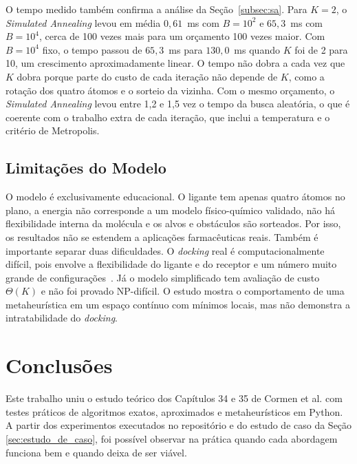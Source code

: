 \documentclass[conference]{IEEEtran}
\theoremstyle{definition}
\theoremstyle{plain}
\begin{document}
O tempo medido também confirma a análise da Seção~\ref{subsec:sa}. Para $K = 2$, o \textit{Simulated Annealing} levou em média $0{,}61$~ms com $B = 10^2$ e $65{,}3$~ms com $B = 10^4$, cerca de 100 vezes mais para um orçamento 100 vezes maior. Com $B = 10^4$ fixo, o tempo passou de $65{,}3$~ms para $130{,}0$~ms quando $K$ foi de 2 para 10, um crescimento aproximadamente linear. O tempo não dobra a cada vez que $K$ dobra porque parte do custo de cada iteração não depende de $K$, como a rotação dos quatro átomos e o sorteio da vizinha. Com o mesmo orçamento, o \textit{Simulated Annealing} levou entre 1,2 e 1,5 vez o tempo da busca aleatória, o que é coerente com o trabalho extra de cada iteração, que inclui a temperatura e o critério de Metropolis.

\subsection{Limitações do Modelo}
\label{subsec:limitacoes}

O modelo é exclusivamente educacional. O ligante tem apenas quatro átomos no plano, a energia não corresponde a um modelo físico-químico validado, não há flexibilidade interna da molécula e os alvos e obstáculos são sorteados. Por isso, os resultados não se estendem a aplicações farmacêuticas reais. Também é importante separar duas dificuldades. O \textit{docking} real é computacionalmente difícil, pois envolve a flexibilidade do ligante e do receptor e um número muito grande de configurações~\cite{pagadala2017software,huang2018comprehensive}. Já o modelo simplificado tem avaliação de custo $\Theta(K)$ e não foi provado NP-difícil. O estudo mostra o comportamento de uma metaheurística em um espaço contínuo com mínimos locais, mas não demonstra a intratabilidade do \textit{docking}.

\section{Conclusões}
\label{sec:conclusao}

Este trabalho uniu o estudo teórico dos Capítulos 34 e 35 de Cormen et al. \cite{cormen2012algoritmos} com testes práticos de algoritmos exatos, aproximados e metaheurísticos em Python. A partir dos experimentos executados no repositório e do estudo de caso da Seção \ref{sec:estudo_de_caso}, foi possível observar na prática quando cada abordagem funciona bem e quando deixa de ser viável.
\end{document}
